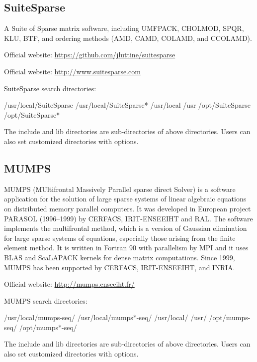 \subsection{SuiteSparse}
A Suite of Sparse matrix software, including UMFPACK, CHOLMOD, SPQR, KLU, BTF, and ordering methods (AMD, CAMD, COLAMD, and CCOLAMD). 

Official website: \url{https://github.com/jluttine/suitesparse} 

Official website: \url{http://www.suitesparse.com}

SuiteSparse search directories:
\begin{evb}
/usr/local/SuiteSparse
/usr/local/SuiteSparse*
/usr/local
/usr
/opt/SuiteSparse 
/opt/SuiteSparse*
\end{evb}

The include and lib directories are sub-directories of above directories. Users can also set customized directories with options.

\subsection{MUMPS}
MUMPS (MUltifrontal Massively Parallel sparse direct Solver) is a software application for the solution of large sparse systems of linear algebraic equations on distributed memory parallel computers. It was developed in European project PARASOL (1996–1999) by CERFACS, IRIT-ENSEEIHT and RAL. The software implements the multifrontal method, which is a version of Gaussian elimination for large sparse systems of equations, especially those arising from the finite element method. It is written in Fortran 90 with parallelism by MPI and it uses BLAS and ScaLAPACK kernels for dense matrix computations. Since 1999, MUMPS has been supported by CERFACS, IRIT-ENSEEIHT, and INRIA. 

Official website: \url{http://mumps.enseeiht.fr/}

MUMPS search directories:
\begin{evb}
/usr/local/mumps-seq/
/usr/local/mumps*-seq/
/usr/local/
/usr/
/opt/mumps-seq/
/opt/mumps*-seq/
\end{evb}

The include and lib directories are sub-directories of above directories. Users can also set customized directories with options.

